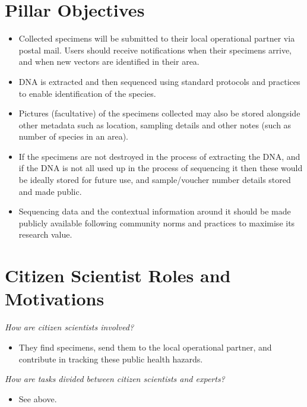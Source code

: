 \documentclass[
]{article}
\providecommand{\tightlist}{%
  \setlength{\itemsep}{0pt}\setlength{\parskip}{0pt}}
\begin{document}
\hypertarget{objectives}{%
\section{Pillar Objectives}\label{objectives}}

\begin{itemize}
\item
  Collected specimens will be submitted to their local operational partner via postal mail. Users should receive notifications when their specimens arrive, and when new vectors are identified in their area.
\item
  DNA is extracted and then sequenced using standard protocols and practices to enable identification of the species.
\item
  Pictures (facultative) of the specimens collected may also be stored alongside other metadata such as location, sampling details and other notes (such as number of species in an area).
\item
  If the specimens are not destroyed in the process of extracting the DNA, and if the DNA is not all used up in the process of sequencing it then these would be ideally stored for future use, and sample/voucher number details stored and made public.
\item
  Sequencing data and the contextual information around it should be made publicly available following community norms and practices to maximise its research value.
\end{itemize}

\hypertarget{citizen-scientist-roles-and-motivations}{%
\section{Citizen Scientist Roles and Motivations}\label{citizen-scientist-roles-and-motivations}}

\emph{How are citizen scientists involved?}

\begin{itemize}
\tightlist
\item
  They find specimens, send them to the local operational partner, and contribute in tracking these public health hazards.
\end{itemize}

\emph{How are tasks divided between citizen scientists and experts?}

\begin{itemize}
\tightlist
\item
  See above.
\end{itemize}
\end{document}
